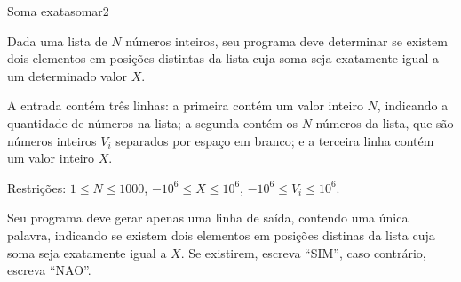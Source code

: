 \documentclass[12pt,a4paper,oneside]{article}
\begin{document}
\begin{problem}{Soma exata}{somar}{2}
 
Dada uma lista de $N$ números inteiros, seu programa deve determinar se existem dois elementos em posições distintas da lista cuja soma seja exatamente igual a um determinado valor $X$.

%

\InputFile

A entrada contém três linhas: a primeira contém um valor inteiro $N$, indicando a quantidade de números na lista; a segunda contém os $N$ números da lista, que são números inteiros $V_i$ separados por espaço em branco; e a terceira linha contém um valor inteiro $X$.

Restrições: $1 \leq N \leq 1000$, $-10^6 \leq X \leq 10^6$, $-10^6 \leq V_i \leq 10^6$.



\OutputFile

Seu programa deve gerar apenas uma linha de saída, contendo uma única palavra, indicando se existem dois elementos em posições distinas da lista cuja soma seja exatamente igual a $X$. Se existirem, escreva ``SIM'', caso contrário, escreva ``NAO''.


\Example

\begin{example}
%
\end{example}

\begin{example}
%
\end{example}

\begin{example}
%
\end{example}


\end{problem}
\end{document}
